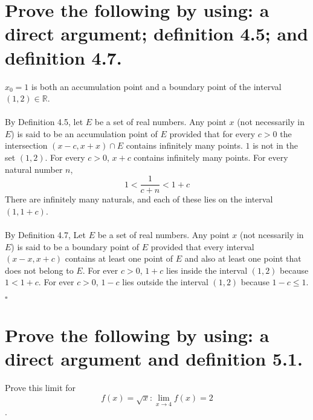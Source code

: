 \documentclass[11pt]{article}
\begin{document}

\section{Prove the following by using: a direct argument; definition 4.5; and definition 4.7.}

$x_0=1$ is both an accumulation point and a boundary point of the interval $(1, 2) \in \mathbb{R}$.

\paragraph{}

By Definition 4.5, let $E$ be a set of real numbers. Any point $x$ (not necessarily in $E$) is said to be an accumulation point of $E$ provided that for every $c>0$ the intersection $(x-c, x+x) \cap E$ contains infinitely many points.
$1$ is not in the set $(1, 2)$.
For every $c>0$, $x+c$ contains infinitely many points.
For every natural number $n$, $$1 < \frac{1}{c+n} < 1+c$$
There are infinitely many naturals, and each of these lies on the interval $(1, 1+c)$.

\paragraph{}

By Definition 4.7, Let $E$ be a set of real numbers. Any point $x$ (not ncessarily in $E$) is said to be a boundary point of $E$ provided that every interval $(x-x, x+c)$ contains at least one point of $E$ and also at least one point that does not belong to $E$.
For ever $c>0$, $1+c$ lies inside the interval $(1, 2)$ because $1<1+c$.
For ever $c>0$, $1-c$ lies outside the interval $(1, 2)$ because $1-c \le 1$.

$\square$

\section{Prove the following by using: a direct argument and definition 5.1.}

Prove this limit for $$f(x)=\sqrt{x}: \lim _{x\to 4} f(x)=2$$.

\paragraph{}
\end{document}
